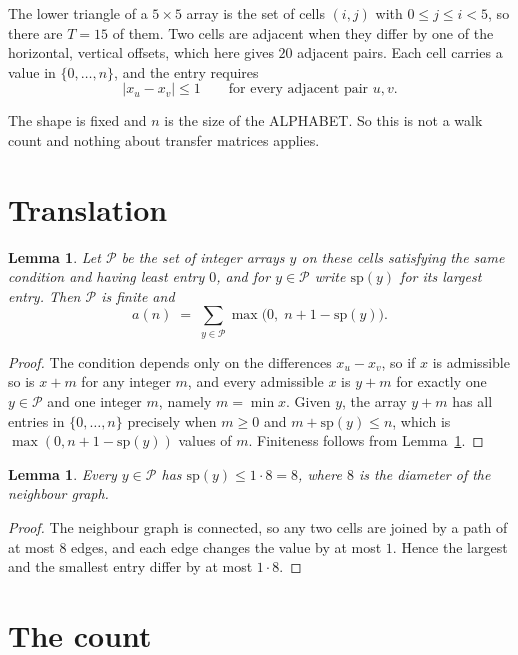 \documentclass[11pt,a4paper]{article}
\theoremstyle{plain}
\newtheorem{lemma}[theorem]{Lemma}
\theoremstyle{definition}
\begin{document}
The lower triangle of a $5\times5$ array is the set of cells $(i,j)$ with $0\le j\le
i<5$, so there are $T=15$ of them. Two cells are adjacent when they differ by one of the
horizontal, vertical offsets, which here gives $20$ adjacent pairs. Each cell carries a value in
$\{0,\dots,n\}$, and the entry requires
\[
|x_u-x_v|\le 1\qquad\text{for every adjacent pair }u,v .
\]

The shape is fixed and $n$ is the size of the ALPHABET. So this is not a walk count and
nothing about transfer matrices applies.

\section{Translation}

\begin{lemma}\label{lem:trans}
Let $\mathcal P$ be the set of integer arrays $y$ on these cells satisfying the same condition
and having least entry $0$, and for $y\in\mathcal P$ write $\mathrm{sp}(y)$ for its largest
entry. Then $\mathcal P$ is finite and
\[
a(n)\;=\;\sum_{y\in\mathcal P}\max\bigl(0,\;n+1-\mathrm{sp}(y)\bigr).
\]
\end{lemma}

\begin{proof}
The condition depends only on the differences $x_u-x_v$, so if $x$ is admissible so is $x+m$
for any integer $m$, and every admissible $x$ is $y+m$ for exactly one $y\in\mathcal P$ and one
integer $m$, namely $m=\min x$. Given $y$, the array $y+m$ has all entries in
$\{0,\dots,n\}$ precisely when $m\ge0$ and $m+\mathrm{sp}(y)\le n$, which is
$\max(0,n+1-\mathrm{sp}(y))$ values of $m$. Finiteness follows from
Lemma~\ref{lem:bound}.
\end{proof}

\begin{lemma}\label{lem:bound}
Every $y\in\mathcal P$ has $\mathrm{sp}(y)\le 1\cdot8=8$, where $8$ is the
diameter of the neighbour graph.
\end{lemma}

\begin{proof}
The neighbour graph is connected, so any two cells are joined by a path of at most $8$
edges, and each edge changes the value by at most $1$. Hence the largest and the smallest
entry differ by at most $1\cdot8$.
\end{proof}

\section{The count}
\end{document}
